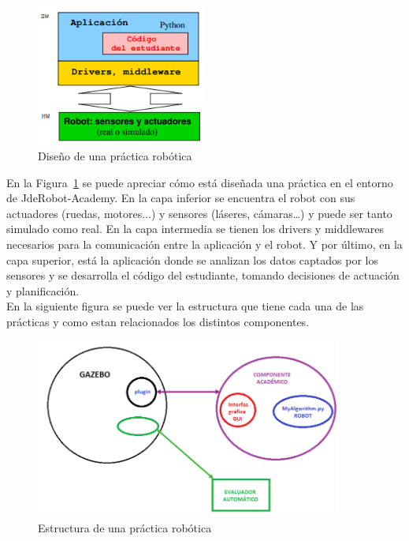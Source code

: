 \begin{figure}[H]
  \begin{center}
    \includegraphics[width=0.5\textwidth]{figures/Introduccion/esquema.png}
		\caption{Diseño de una práctica robótica}
		\label{fig.esquema}
		\end{center}
\end{figure}

En la Figura~\ref{fig.esquema} se puede apreciar cómo está diseñada una práctica en el entorno de JdeRobot-Academy. En la capa inferior se encuentra el robot con sus actuadores (ruedas, motores...) y sensores (láseres, cámaras…) y puede ser tanto simulado como real.  En la capa intermedia se tienen los drivers y middlewares necesarios para la comunicación entre la aplicación y el robot. Y por último, en la capa superior, está la aplicación donde se analizan los datos captados por los sensores y se desarrolla el código del estudiante, tomando decisiones de actuación y planificación. \\

En la siguiente figura se puede ver la estructura que tiene cada una de las prácticas y como estan relacionados los distintos componentes.

\begin{figure}[H]
  \begin{center}
    \includegraphics[width=0.9\textwidth]{figures/Introduccion/estructura.png}
		\caption{Estructura de una práctica robótica}
		\label{fig.estructura}
		\end{center}
\end{figure}


